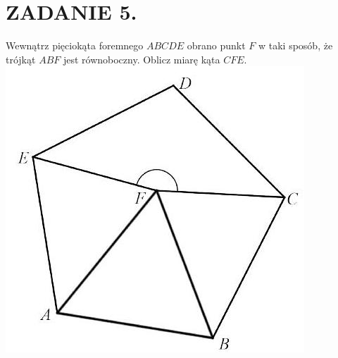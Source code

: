 \documentclass[10pt]{article}
\begin{document}
\section*{ZADANIE 5.}
Wewnątrz pięciokąta foremnego \(A B C D E\) obrano punkt \(F\) w taki sposób, że trójkąt \(A B F\) jest równoboczny. Oblicz miarę kąta \(C F E\).\\
\includegraphics[max width=\textwidth, center]{2024_11_21_a5b230033f508f480714g-1}
\end{document}
